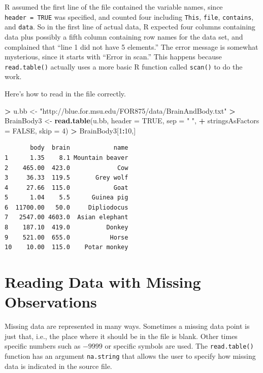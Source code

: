 \documentclass[]{krantz}
\makeatletter
\newenvironment{Shaded}{\begin{snugshade}}{\end{snugshade}}
\newcommand{\KeywordTok}[1]{\textcolor[rgb]{0.27,0.27,0.27}{\textbf{#1}}}
\newcommand{\DataTypeTok}[1]{\textcolor[rgb]{0.27,0.27,0.27}{#1}}
\newcommand{\DecValTok}[1]{\textcolor[rgb]{0.06,0.06,0.06}{#1}}
\newcommand{\StringTok}[1]{\textcolor[rgb]{0.5,0.5,0.5}{#1}}
\newcommand{\OtherTok}[1]{\textcolor[rgb]{0.37,0.37,0.37}{#1}}
\newcommand{\OperatorTok}[1]{\textcolor[rgb]{0.43,0.43,0.43}{\textbf{#1}}}
\newcommand{\NormalTok}[1]{#1}
\newenvironment{kframe}{%
\medskip{}
\setlength{\fboxsep}{.8em}
 \def\at@end@of@kframe{}%
 \ifinner\ifhmode%
  \def\at@end@of@kframe{\end{minipage}}%
  \begin{minipage}{\columnwidth}%
 \fi\fi%
 \def\FrameCommand##1{\hskip\@totalleftmargin \hskip-\fboxsep
 \colorbox{shadecolor}{##1}\hskip-\fboxsep
     \hskip-\linewidth \hskip-\@totalleftmargin \hskip\columnwidth}%
 \MakeFramed {\advance\hsize-\width
   \@totalleftmargin\z@ \linewidth\hsize
   \@setminipage}}%
 {\par\unskip\endMakeFramed%
 \at@end@of@kframe}
\renewenvironment{Shaded}{\begin{kframe}}{\end{kframe}}
\makeatother
\begin{document}
R assumed the first line of the file contained the variable names, since
\texttt{header\ =\ TRUE} was specified, and counted four including
\texttt{This}, \texttt{file}, \texttt{contains}, and \texttt{data}. So
in the first line of actual data, R expected four columns containing
data plus possibly a fifth column containing row names for the data set,
and complained that ``line 1 did not have 5 elements.'' The error
message is somewhat mysterious, since it starts with ``Error in scan.''
This happens because \texttt{read.table()} actually uses a more basic R
function called \texttt{scan()} to do the work.

Here's how to read in the file correctly.

\begin{Shaded}
\begin{Highlighting}[]
\OperatorTok{>}\StringTok{ }\NormalTok{u.bb <-}\StringTok{ "http://blue.for.msu.edu/FOR875/data/BrainAndBody.txt"}
\OperatorTok{>}\StringTok{ }\NormalTok{BrainBody3 <-}\StringTok{ }\KeywordTok{read.table}\NormalTok{(u.bb, }\DataTypeTok{header =} \OtherTok{TRUE}\NormalTok{, }\DataTypeTok{sep =} \StringTok{" "}\NormalTok{, }
\OperatorTok{+}\StringTok{                          }\DataTypeTok{stringsAsFactors =} \OtherTok{FALSE}\NormalTok{, }\DataTypeTok{skip =} \DecValTok{4}\NormalTok{)}
\OperatorTok{>}\StringTok{ }\NormalTok{BrainBody3[}\DecValTok{1}\OperatorTok{:}\DecValTok{10}\NormalTok{,]}
\end{Highlighting}
\end{Shaded}

\begin{verbatim}
       body  brain            name
1      1.35    8.1 Mountain beaver
2    465.00  423.0             Cow
3     36.33  119.5       Grey wolf
4     27.66  115.0            Goat
5      1.04    5.5      Guinea pig
6  11700.00   50.0     Dipliodocus
7   2547.00 4603.0  Asian elephant
8    187.10  419.0          Donkey
9    521.00  655.0           Horse
10    10.00  115.0    Potar monkey
\end{verbatim}

\section{Reading Data with Missing
Observations}\label{reading-data-with-missing-observations}

Missing data are represented in many ways. Sometimes a missing data
point is just that, i.e., the place where it should be in the file is
blank. Other times specific numbers such as \(-9999\) or specific
symbols are used. The \texttt{read.table()} function has an argument
\texttt{na.string} that allows the user to specify how missing data is
indicated in the source file.
\end{document}
